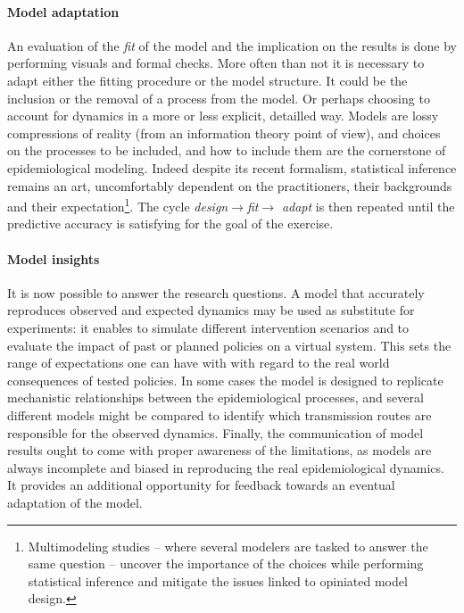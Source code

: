 \paragraph{Model adaptation} An evaluation of the \textit{fit} of the model and the implication on the results is done by performing visuals and formal checks. More often than not it is necessary to adapt either the fitting procedure or the model structure. It could be the inclusion or the removal of a process from the model. Or perhaps choosing to account for dynamics in a more or less explicit, detailled way. Models are lossy compressions of reality (from an information theory point of view), and choices on the processes to be included, and how to include them are the cornerstone of epidemiological modeling. Indeed despite its recent formalism, statistical inference remains an art, uncomfortably dependent on the practitioners, their backgrounds and their expectation\footnote{Multimodeling studies -- where several modelers are tasked to answer the same question -- uncover the importance of the choices while performing statistical inference and mitigate the issues linked to opiniated model design.}. The cycle \textit{design}$\rightarrow$\textit{fit}$\rightarrow$ \textit{adapt} is then repeated until the predictive accuracy is satisfying for the goal of the exercise. 

\paragraph{Model insights}  It is now possible to answer the research questions. A model that accurately reproduces observed and expected dynamics may be used as substitute for experiments: it enables to simulate different intervention scenarios and to evaluate the impact of past or planned policies on a virtual system. This sets the range of expectations one can have with with regard to the real world consequences of tested policies. In some cases the model is designed to replicate mechanistic relationships between the epidemiological processes, and several different models might be compared to identify which transmission routes are responsible for the observed dynamics.  Finally, the communication of model results ought to come with proper awareness of the limitations, as models are always incomplete and biased in reproducing the real epidemiological dynamics. It provides an additional opportunity for feedback towards an eventual adaptation of the model\cite{Heesterbeek:ModelingInfectiousDisease:2015}. 

